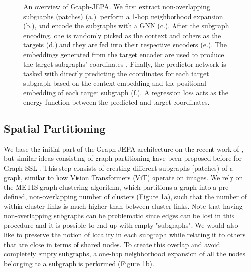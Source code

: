 \documentclass{article} \usepackage{iclr2024_conference,times}
\begin{document}
\begin{figure}
    \centering
    \caption{An overview of Graph-JEPA. We first extract non-overlapping subgraphs (patches) (a.), perform a 1-hop neighborhood expansion (b.), and encode the subgraphs with a GNN (c.). After the subgraph encoding, one is randomly picked as the context and  others as the targets (d.) and they are fed into their respective encoders (e.). The embeddings generated from the target encoder are used to produce the target subgraphs' coordinates . Finally, the predictor network is tasked with directly predicting the coordinates  for each target subgraph based on the context embedding and the positional embedding of each target subgraph (f.). A regression loss acts as the energy function  between the predicted and target coordinates.} 
    \label{fig:graphjepa-diagram}
\end{figure}


\subsection{Spatial Partitioning} \label{met:partitioning}
We base the initial part of the Graph-JEPA architecture on the recent work of \citet{he2023generalization}, but similar ideas consisting of graph partitioning have been proposed before for Graph SSL \citep{jin2020self}. This step consists of creating different subgraphs (patches) of a graph, similar to how Vision Transformers (ViT) \citep{dosovitskiy2020image} operate on images. We rely on the METIS \citep{karypis1998fast} graph clustering algorithm, which partitions a graph into a pre-defined, non-overlapping number of clusters  (Figure \ref{fig:graphjepa-diagram}a), such that the number of within-cluster links is much higher than between-cluster links. Note that having non-overlapping subgraphs can be problematic since edges can be lost in this procedure and it is possible to end up with empty "subgraphs". We would also like to preserve the notion of locality in each subgraph while relating it to others that are close in terms of shared nodes. To create this overlap and avoid completely empty subgraphs, a one-hop neighborhood expansion of all the nodes belonging to a subgraph is performed (Figure \ref{fig:graphjepa-diagram}b).
\end{document}
